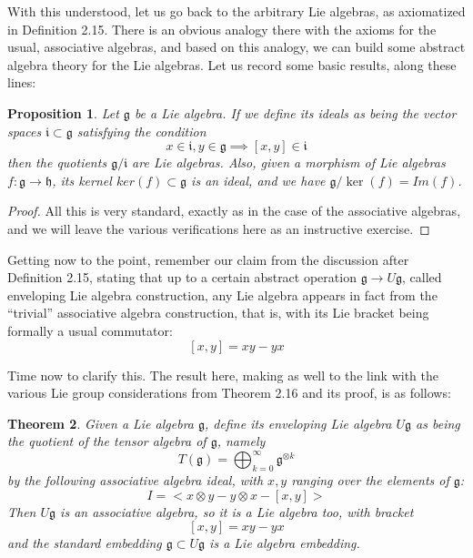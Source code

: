 \documentclass[12pt]{amsbook}
\newtheorem{theorem}{Theorem}[chapter]
\newtheorem{proposition}[theorem]{Proposition}
\begin{document}
With this understood, let us go back to the arbitrary Lie algebras, as axiomatized in Definition 2.15. There is an obvious analogy there with the axioms for the usual, associative algebras, and based on this analogy, we can build some abstract algebra theory for the Lie algebras. Let us record some basic results, along these lines:

\begin{proposition}
Let $\mathfrak g$ be a Lie algebra. If we define its ideals as being the vector spaces $\mathfrak i\subset\mathfrak g$ satisfying the condition
$$x\in\mathfrak i,y\in\mathfrak g\implies[x,y]\in\mathfrak i$$
then the quotients $\mathfrak g/\mathfrak i$ are Lie algebras. Also, given a morphism of Lie algebras $f:\mathfrak g\to\mathfrak h$, its kernel $ker(f)\subset\mathfrak g$ is an ideal, and we have $\mathfrak g/\ker(f)=Im(f)$.
\end{proposition}

\begin{proof}
All this is very standard, exactly as in the case of the associative algebras, and we will leave the various verifications here as an instructive exercise.
\end{proof}

Getting now to the point, remember our claim from the discussion after Definition 2.15, stating that up to a certain abstract operation $\mathfrak g\to U\mathfrak g$, called enveloping Lie algebra construction, any Lie algebra appears in fact from the ``trivial'' associative algebra construction, that is, with its Lie bracket being formally a usual commutator:
$$[x,y]=xy-yx$$

Time now to clarify this. The result here, making as well to the link with the various Lie group considerations from Theorem 2.16 and its proof, is as follows:


\begin{theorem}
Given a Lie algebra $\mathfrak g$, define its enveloping Lie algebra $U\mathfrak g$ as being the quotient of the tensor algebra of $\mathfrak g$, namely
$$T(\mathfrak g)=\bigoplus_{k=0}^\infty\mathfrak g^{\otimes k}$$
by the following associative algebra ideal, with $x,y$ ranging over the elements of $\mathfrak g$:
$$I=<x\otimes y-y\otimes x-[x,y]>$$
Then $U\mathfrak g$ is an associative algebra, so it is a Lie algebra too, with bracket 
$$[x,y]=xy-yx$$
and the standard embedding $\mathfrak g\subset U\mathfrak g$ is a Lie algebra embedding.\end{theorem}
\end{document}
